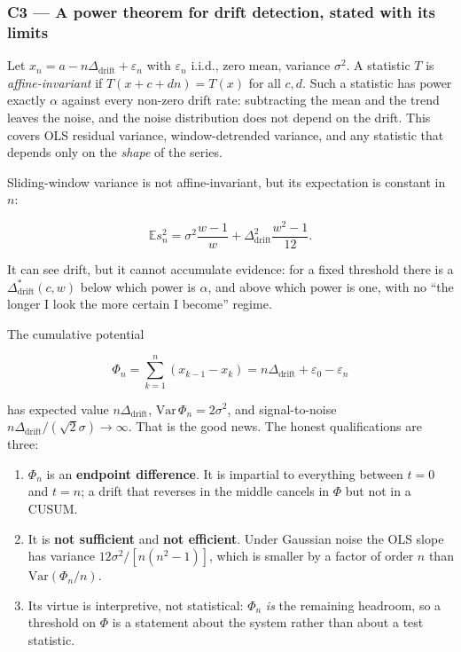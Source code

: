 \documentclass[11pt,a4paper]{article}
\providecommand{\tightlist}{\setlength{\itemsep}{0pt}\setlength{\parskip}{0pt}}
\begin{document}
\subsubsection{C3 --- A power theorem for drift detection, stated with its limits}\label{c3-a-power-theorem-for-drift-detection-stated-with-its-limits}

Let \(x_n=a-n\Delta_{\mathrm{drift}}+\varepsilon_n\) with \(\varepsilon_n\) i.i.d., zero mean,
variance \(\sigma^2\). A statistic \(T\) is \emph{affine-invariant} if
\(T(x+c+dn)=T(x)\) for all \(c,d\). Such a statistic has power exactly \(\alpha\)
against every non-zero drift rate: subtracting the mean and the trend leaves the
noise, and the noise distribution does not depend on the drift. This covers OLS
residual variance, window-detrended variance, and any statistic that depends only
on the \emph{shape} of the series.

Sliding-window variance is not affine-invariant, but its expectation is
constant in \(n\):

\[
\mathbb{E}s_n^2=\sigma^2\frac{w-1}{w}+\Delta_{\mathrm{drift}}^2\frac{w^2-1}{12}.
\]

It can see drift, but it cannot accumulate evidence: for a fixed threshold there
is a \(\Delta_{\mathrm{drift}}^\ast(c,w)\) below which power is \(\alpha\), and above
which power is one, with no ``the longer I look the more certain I become''
regime.

The cumulative potential

\[
\Phi_n=\sum_{k=1}^{n}(x_{k-1}-x_k)=n\Delta_{\mathrm{drift}}+\varepsilon_0-\varepsilon_n
\]

has expected value \(n\Delta_{\mathrm{drift}}\),
\(\mathrm{Var}\,\Phi_n=2\sigma^2\), and signal-to-noise
\(n\Delta_{\mathrm{drift}}/(\sqrt2\sigma)\to\infty\). That is the good news. The
honest qualifications are three:

\begin{enumerate}
\def\labelenumi{\arabic{enumi}.}
\tightlist
\item
  \(\Phi_n\) is an \textbf{endpoint difference}. It is impartial to everything between
  \(t=0\) and \(t=n\); a drift that reverses in the middle cancels in \(\Phi\) but not
  in a CUSUM.
\item
  It is \textbf{not sufficient} and \textbf{not efficient}. Under Gaussian noise the OLS
  slope has variance \(12\sigma^2/[n(n^2-1)]\), which is smaller by a factor of
  order \(n\) than \(\mathrm{Var}(\Phi_n/n)\).
\item
  Its virtue is interpretive, not statistical: \(\Phi_n\) \emph{is} the remaining
  headroom, so a threshold on \(\Phi\) is a statement about the system rather than
  about a test statistic.
\end{enumerate}
\end{document}

